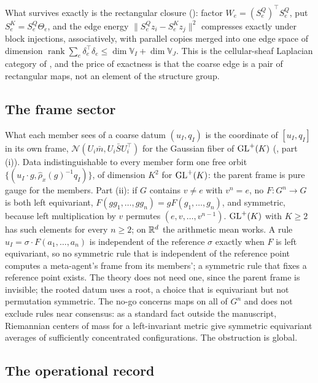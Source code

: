 What survives exactly is the rectangular closure (): factor
$W_e=(S^Q_e)^\top S^Q_e$, put $S^K_e=S^Q_e\Theta_e$, and the edge energy
$\lVert S^Q_ez_i-S^K_ez_j\rVert^2$ compresses exactly under block injections, associatively, with parallel
copies merged into one edge space of dimension
$\operatorname{rank}\sum_e\delta_e^\top\delta_e\leq\dim\mathbb V_I+\dim\mathbb V_J$. This is the
cellular-sheaf Laplacian category of \citet{HansenGhrist2019}, and the price of exactness is that the
coarse edge is a pair of rectangular maps, not an element of the structure group.

\subsection{The frame sector}

What each member sees of a coarse datum $(u_I,q_I)$ is the coordinate of $[u_I,q_I]$ in its own frame,
$\mathcal N(U_i\bar m,U_i\bar SU_i^\top)$ for the Gaussian fiber of $\mathrm{GL}^+(K)$ (,
part (i)). Data indistinguishable to every member form one free orbit
$\{(u_I\cdot g,\widehat\rho_x(g)^{-1}q_I)\}$, of dimension $K^2$ for $\mathrm{GL}^+(K)$: the parent frame is pure
gauge for the members. Part (ii): if $G$ contains $v\neq e$ with $v^n=e$, no $F:G^n\to G$ is both left
equivariant, $F(gg_1,\ldots,gg_n)=gF(g_1,\ldots,g_n)$, and symmetric, because left multiplication by $v$
permutes $(e,v,\ldots,v^{n-1})$. $\mathrm{GL}^+(K)$ with $K\geq2$ has such elements for every $n\geq2$; on $\mathbb R^d$
the arithmetic mean works. A rule $u_I=\sigma\cdot F(a_1,\ldots,a_n)$ is independent of the reference
$\sigma$ exactly when $F$ is left equivariant, so no symmetric rule that is independent of the reference
point computes a meta-agent's frame from its members'; a symmetric rule that fixes a reference point
exists. The theory does not need one, since the parent frame is invisible; the rooted datum uses
a root, a choice that is equivariant but not permutation symmetric. The no-go concerns maps on all of
$G^n$ and does not exclude rules near consensus: as a standard fact outside the manuscript, Riemannian
centers of mass for a left-invariant metric \citep{Karcher1977} give symmetric equivariant averages of
sufficiently concentrated configurations. The obstruction is global.

\subsection{The operational record}

